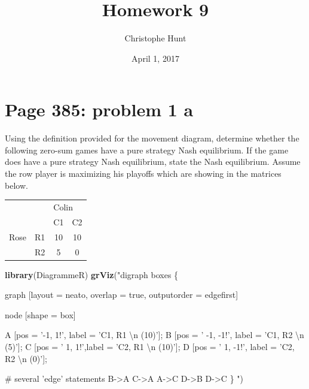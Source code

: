 \documentclass[]{article}
\title{Homework 9}
\author{Christophe Hunt}
\date{April 1, 2017}
\newenvironment{Shaded}{\begin{snugshade}}{\end{snugshade}}
\newcommand{\KeywordTok}[1]{\textcolor[rgb]{0.13,0.29,0.53}{\textbf{{#1}}}}
\newcommand{\CharTok}[1]{\textcolor[rgb]{0.31,0.60,0.02}{{#1}}}
\newcommand{\StringTok}[1]{\textcolor[rgb]{0.31,0.60,0.02}{{#1}}}
\newcommand{\NormalTok}[1]{{#1}}
\begin{document}
\maketitle

{
\setcounter{tocdepth}{2}
\tableofcontents
}
\newpage

\section{Page 385: problem 1 a}\label{page-385-problem-1-a}

Using the definition provided for the movement diagram, determine
whether the following zero-sum games have a pure strategy Nash
equilibrium. If the game does have a pure strategy Nash equilibrium,
state the Nash equilibrium. Assume the row player is maximizing his
playoffs which are showing in the matrices below.

\begin{table}[!h]
\centering
\begin{tabular}{lllc}
 &  & \multicolumn{2}{l}{Colin} \\ \cline{3-4}
 &  & C1 & \multicolumn{1}{l}{C2} \\ \hline
Rose & R1 & \multicolumn{1}{c}{10} & 10 \\
 & R2 & \multicolumn{1}{c}{5} & 0 \\ \hline
\end{tabular}
\end{table}

\begin{Shaded}
\begin{Highlighting}[]
\KeywordTok{library}\NormalTok{(DiagrammeR)}
\KeywordTok{grViz}\NormalTok{(}\StringTok{"digraph boxes \{}

\StringTok{  graph [layout = neato, overlap = true, outputorder = edgefirst]}

\StringTok{  node [shape = box]}

\StringTok{  A [pos = '-1, 1!', label = 'C1, R1 }\CharTok{\textbackslash{}n}\StringTok{ (10)']; }
\StringTok{  B [pos = ' -1, -1!', label = 'C1, R2 }\CharTok{\textbackslash{}n}\StringTok{ (5)']; }
\StringTok{  C [pos = ' 1, 1!',label = 'C2, R1 }\CharTok{\textbackslash{}n}\StringTok{ (10)']; }
\StringTok{  D [pos = ' 1, -1!', label = 'C2, R2 }\CharTok{\textbackslash{}n}\StringTok{ (0)']; }

\StringTok{  # several 'edge' statements}
\StringTok{  B->A C->A A->C D->B D->C }
\StringTok{\}}
\StringTok{"}\NormalTok{)}
\end{Highlighting}
\end{Shaded}
\end{document}
